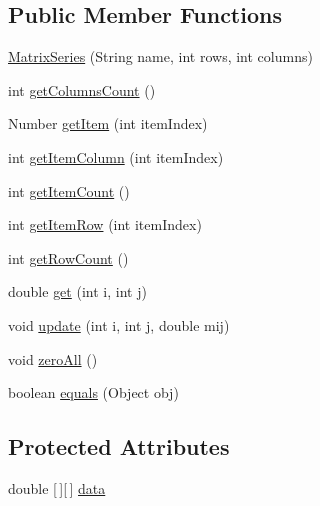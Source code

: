 \subsection*{Public Member Functions}
\begin{DoxyCompactItemize}
\item 
\mbox{\hyperlink{classorg_1_1jfree_1_1data_1_1xy_1_1_matrix_series_a592431806b09188de33bbcd7490526f0}{Matrix\+Series}} (String name, int rows, int columns)
\item 
int \mbox{\hyperlink{classorg_1_1jfree_1_1data_1_1xy_1_1_matrix_series_ad4416aec274e384b9043e899ea4c68b0}{get\+Columns\+Count}} ()
\item 
Number \mbox{\hyperlink{classorg_1_1jfree_1_1data_1_1xy_1_1_matrix_series_ad77ed9610997bea1f37b95a3ecaf238a}{get\+Item}} (int item\+Index)
\item 
int \mbox{\hyperlink{classorg_1_1jfree_1_1data_1_1xy_1_1_matrix_series_a3ed5405c62c33e1a4956902d2d9d7cd1}{get\+Item\+Column}} (int item\+Index)
\item 
int \mbox{\hyperlink{classorg_1_1jfree_1_1data_1_1xy_1_1_matrix_series_aeba52f89811d72702b3347b9e7e4bfb3}{get\+Item\+Count}} ()
\item 
int \mbox{\hyperlink{classorg_1_1jfree_1_1data_1_1xy_1_1_matrix_series_a86800fc58fce529793902f89f1beb816}{get\+Item\+Row}} (int item\+Index)
\item 
int \mbox{\hyperlink{classorg_1_1jfree_1_1data_1_1xy_1_1_matrix_series_ac6e2e1491fbbc51fc0907f3769ee5da2}{get\+Row\+Count}} ()
\item 
double \mbox{\hyperlink{classorg_1_1jfree_1_1data_1_1xy_1_1_matrix_series_a673ce1dc727458893120d67ed4e7a35c}{get}} (int i, int j)
\item 
void \mbox{\hyperlink{classorg_1_1jfree_1_1data_1_1xy_1_1_matrix_series_ab37bc40ca0ac68127fdb1b61b08937c6}{update}} (int i, int j, double mij)
\item 
void \mbox{\hyperlink{classorg_1_1jfree_1_1data_1_1xy_1_1_matrix_series_a4a6f83a4d9d6f2cf143fc47ee83b3e5d}{zero\+All}} ()
\item 
boolean \mbox{\hyperlink{classorg_1_1jfree_1_1data_1_1xy_1_1_matrix_series_a49fea6c1fa7e3a07354b7d7aeb4ff915}{equals}} (Object obj)
\end{DoxyCompactItemize}
\subsection*{Protected Attributes}
\begin{DoxyCompactItemize}
\item 
double \mbox{[}$\,$\mbox{]}\mbox{[}$\,$\mbox{]} \mbox{\hyperlink{classorg_1_1jfree_1_1data_1_1xy_1_1_matrix_series_a08a6cb94c4bd17679afea5ee9e2c87a7}{data}}
\end{DoxyCompactItemize}
